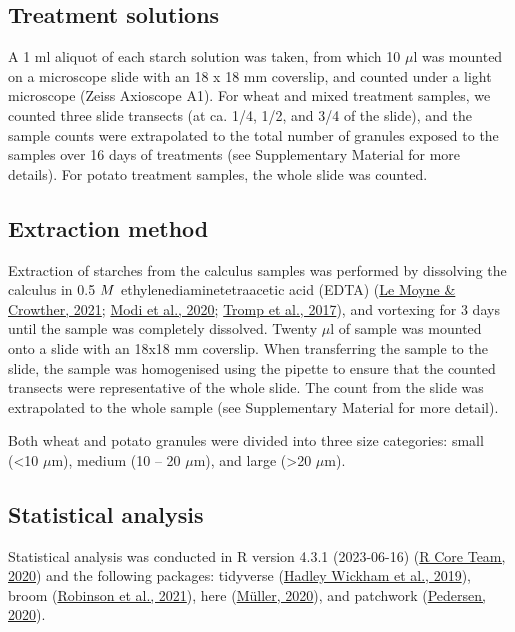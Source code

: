 \documentclass[
  letterpaper,
]{book}
\begin{document}
\hypertarget{treatment-solutions}{%
\subsection{Treatment solutions}\label{treatment-solutions}}

A 1 ml aliquot of each starch solution was taken, from which 10 \(\mu\)l
was mounted on a microscope slide with an 18 x 18 mm coverslip, and
counted under a light microscope (Zeiss Axioscope A1). For wheat and
mixed treatment samples, we counted three slide transects (at ca. 1/4,
1/2, and 3/4 of the slide), and the sample counts were extrapolated to
the total number of granules exposed to the samples over 16 days of
treatments (see Supplementary Material for more details). For potato
treatment samples, the whole slide was counted.

\hypertarget{extraction-method}{%
\subsection{Extraction method}\label{extraction-method}}

Extraction of starches from the calculus samples was performed by
dissolving the calculus in 0.5 \(\tiny{M}\) ethylenediaminetetraacetic
acid (EDTA) (\protect\hyperlink{ref-lemoyneCalculusPretreatments2021}{Le
Moyne \& Crowther, 2021};
\protect\hyperlink{ref-modiCalculusMethodologies2020}{Modi et al.,
2020}; \protect\hyperlink{ref-trompEDTACalculus2017}{Tromp et al.,
2017}), and vortexing for 3 days until the sample was completely
dissolved. Twenty \(\mu\)l of sample was mounted onto a slide with an
18x18 mm coverslip. When transferring the sample to the slide, the
sample was homogenised using the pipette to ensure that the counted
transects were representative of the whole slide. The count from the
slide was extrapolated to the whole sample (see Supplementary Material
for more detail).

Both wheat and potato granules were divided into three size categories:
small (\textless10 \(\mu\)m), medium (10 -- 20 \(\mu\)m), and large
(\textgreater20 \(\mu\)m).

\hypertarget{statistical-analysis}{%
\subsection{Statistical analysis}\label{statistical-analysis}}

Statistical analysis was conducted in R version 4.3.1 (2023-06-16)
(\protect\hyperlink{ref-Rbase}{R Core Team, 2020}) and the following
packages: tidyverse (\protect\hyperlink{ref-tidyverse2019}{Hadley
Wickham et al., 2019}), broom (\protect\hyperlink{ref-Rbroom}{Robinson
et al., 2021}), here (\protect\hyperlink{ref-Rhere}{Müller, 2020}), and
patchwork (\protect\hyperlink{ref-Rpatchwork}{Pedersen, 2020}).
\end{document}
